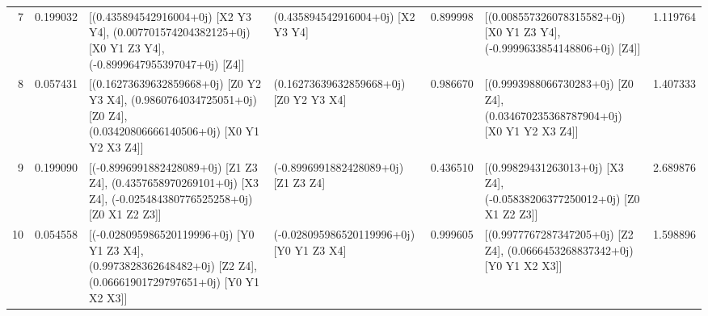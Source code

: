 \begin{tabular}{rrllrlr}
       7 &      0.199032 &                                                                                                                                                                                                                                                     [(0.435894542916004+0j) [X2 Y3 Y4], (0.007701574204382125+0j) [X0 Y1 Z3 Y4], (-0.8999647955397047+0j) [Z4]] &            (0.435894542916004+0j) [X2 Y3 Y4] &      0.899998 &                                                                                                                                                                                                                                                   [(0.008557326078315582+0j) [X0 Y1 Z3 Y4], (-0.9999633854148806+0j) [Z4]] &  1.119764 \\
       8 &      0.057431 &                                                                                                                                                                                                                                            [(0.16273639632859668+0j) [Z0 Y2 Y3 X4], (0.9860764034725051+0j) [Z0 Z4], (0.03420806666140506+0j) [X0 Y1 Y2 X3 Z4]] &       (0.16273639632859668+0j) [Z0 Y2 Y3 X4] &      0.986670 &                                                                                                                                                                                                                                              [(0.9993988066730283+0j) [Z0 Z4], (0.034670235368787904+0j) [X0 Y1 Y2 X3 Z4]] &  1.407333 \\
       9 &      0.199090 &                                                                                                                                                                                                                                                [(-0.8996991882428089+0j) [Z1 Z3 Z4], (0.4357658970269101+0j) [X3 Z4], (-0.025484380776525258+0j) [Z0 X1 Z2 Z3]] &          (-0.8996991882428089+0j) [Z1 Z3 Z4] &      0.436510 &                                                                                                                                                                                                                                                   [(0.99829431263013+0j) [X3 Z4], (-0.05838206377250012+0j) [Z0 X1 Z2 Z3]] &  2.689876 \\
      10 &      0.054558 &                                                                                                                                                                                                                                             [(-0.028095986520119996+0j) [Y0 Y1 Z3 X4], (0.9973828362648482+0j) [Z2 Z4], (0.06661901729797651+0j) [Y0 Y1 X2 X3]] &     (-0.028095986520119996+0j) [Y0 Y1 Z3 X4] &      0.999605 &                                                                                                                                                                                                                                                   [(0.9977767287347205+0j) [Z2 Z4], (0.0666453268837342+0j) [Y0 Y1 X2 X3]] &  1.598896 \\

\end{tabular}
